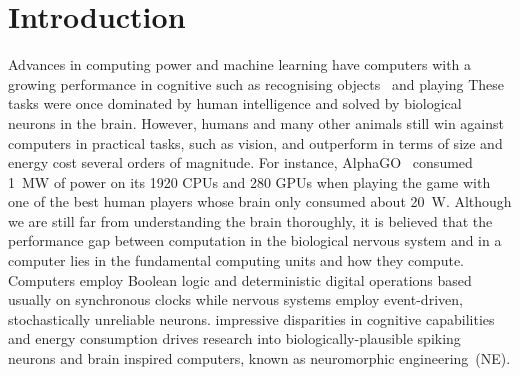 \chapter{Introduction}
\label{cha:intro}
Advances in computing power and machine learning have \protect{} \protect{} computers with a \protect{} \protect{} growing performance in cognitive \protect{} \protect{} such as recognising objects~\citep{deng2009imagenet} and playing \protect{} \protect{}\citep{silver2016mastering}\protect{} 
These tasks were once dominated by human intelligence and solved by biological neurons in the brain.
However, humans and many other animals still win against computers in practical tasks, such as vision, and outperform \protect{} in terms of size and energy cost \protect{} \protect{} several orders of magnitude.
For instance, AlphaGO~\citep{silver2016mastering} consumed 1~MW of power on its 1920 CPUs and 280 GPUs when playing the game with one of the best human players whose brain only consumed about 20~W.
Although we are still far from understanding the brain thoroughly, it is believed that the performance gap between computation in the biological nervous system and in a computer lies in the fundamental computing units and how they compute.
Computers employ Boolean logic and deterministic digital operations based usually on synchronous clocks while nervous systems employ \protect{} \protect{} event-driven, stochastically unreliable \protect{} \protect{}\citep{indiveri2009artificial}\protect\TLSins{:} neurons.
\protect{}
\protect{} impressive disparities in cognitive capabilities and energy consumption drives \protect{} research into biologically-plausible spiking neurons and brain inspired computers, known as neuromorphic engineering~(NE).



\protect{}


